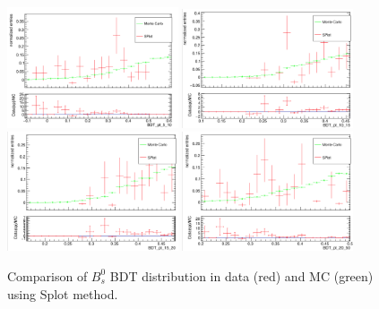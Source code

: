 \begin{figure}[h]
\begin{center}
\includegraphics[width=0.45\textwidth]{Figures/Chapter4/Bs_BDT_5_10.png}
\includegraphics[width=0.45\textwidth]{Figures/Chapter4/Bs_BDT_10_15.png}
\includegraphics[width=0.45\textwidth]{Figures/Chapter4/Bs_BDT_15_20.png}
\includegraphics[width=0.45\textwidth]{Figures/Chapter4/Bs_BDT_20_50.png}
\caption{Comparison of $B^0_s$ BDT distribution in data (red) and MC (green) using Splot method.}
\label{BsMCData}
\end{center}
\end{figure}

